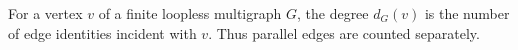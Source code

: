\begin{definition}
For a vertex $v$ of a finite loopless multigraph $G$, the degree
$d_G(v)$ is the number of edge identities incident with $v$.  Thus parallel
edges are counted separately.
\end{definition}

